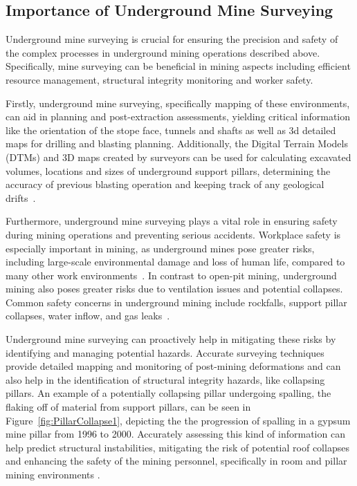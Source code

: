 \subsection{Importance of Underground Mine Surveying}
Underground mine surveying is crucial for ensuring the precision and safety of the complex processes in underground mining operations described above. Specifically, mine surveying can be beneficial in mining aspects including efficient resource management, structural integrity monitoring and worker safety.

Firstly, underground mine surveying, specifically mapping of these environments, can aid in planning and post-extraction assessments, yielding critical information like the orientation of the stope face, tunnels and shafts as well as 3d detailed maps for drilling and blasting planning. Additionally, the Digital Terrain Models (DTMs) and 3D maps created by surveyors can be used for calculating excavated volumes, locations and sizes of underground support pillars, determining the accuracy of previous blasting operation and keeping track of any geological drifts~\cite{Ellmann2021}.

Furthermore, underground mine surveying plays a vital role in ensuring safety during mining operations and preventing serious accidents. Workplace safety is especially important in mining, as underground mines pose greater risks, including large-scale environmental damage and loss of human life, compared to many other work environments~\cite{John2021}. In contrast to open-pit mining, underground mining also poses greater risks due to ventilation issues and potential collapses. Common safety concerns in underground mining include rockfalls, support pillar collapses, water inflow, and gas leaks~\cite{Han2021}.  

Underground mine surveying can proactively help in mitigating these risks by identifying and managing potential hazards. Accurate surveying techniques provide detailed mapping and monitoring of post-mining deformations and can also help in the identification of structural integrity hazards, like collapsing pillars. An example of a potentially collapsing pillar undergoing spalling, the flaking off of material from support pillars, can be seen in Figure~\ref{fig:PillarCollapse1}, depicting the the progression of spalling in a gypsum mine pillar from 1996 to 2000\cite{Sorgi2011}.  Accurately assessing this kind of information can help predict structural instabilities, mitigating the risk of potential roof collapses and enhancing the safety of the mining personnel, specifically in room and pillar mining environments \cite{Yao2024}. 

